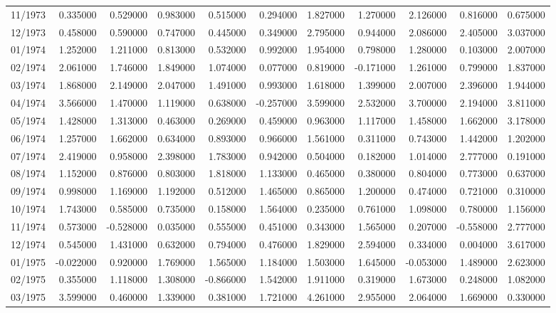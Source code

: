 \begin{tabular}{lrrrrrrrrrr}
11/1973 & 0.335000 & 0.529000 & 0.983000 & 0.515000 & 0.294000 & 1.827000 & 1.270000 & 2.126000 & 0.816000 & 0.675000 \\
12/1973 & 0.458000 & 0.590000 & 0.747000 & 0.445000 & 0.349000 & 2.795000 & 0.944000 & 2.086000 & 2.405000 & 3.037000 \\
01/1974 & 1.252000 & 1.211000 & 0.813000 & 0.532000 & 0.992000 & 1.954000 & 0.798000 & 1.280000 & 0.103000 & 2.007000 \\
02/1974 & 2.061000 & 1.746000 & 1.849000 & 1.074000 & 0.077000 & 0.819000 & -0.171000 & 1.261000 & 0.799000 & 1.837000 \\
03/1974 & 1.868000 & 2.149000 & 2.047000 & 1.491000 & 0.993000 & 1.618000 & 1.399000 & 2.007000 & 2.396000 & 1.944000 \\
04/1974 & 3.566000 & 1.470000 & 1.119000 & 0.638000 & -0.257000 & 3.599000 & 2.532000 & 3.700000 & 2.194000 & 3.811000 \\
05/1974 & 1.428000 & 1.313000 & 0.463000 & 0.269000 & 0.459000 & 0.963000 & 1.117000 & 1.458000 & 1.662000 & 3.178000 \\
06/1974 & 1.257000 & 1.662000 & 0.634000 & 0.893000 & 0.966000 & 1.561000 & 0.311000 & 0.743000 & 1.442000 & 1.202000 \\
07/1974 & 2.419000 & 0.958000 & 2.398000 & 1.783000 & 0.942000 & 0.504000 & 0.182000 & 1.014000 & 2.777000 & 0.191000 \\
08/1974 & 1.152000 & 0.876000 & 0.803000 & 1.818000 & 1.133000 & 0.465000 & 0.380000 & 0.804000 & 0.773000 & 0.637000 \\
09/1974 & 0.998000 & 1.169000 & 1.192000 & 0.512000 & 1.465000 & 0.865000 & 1.200000 & 0.474000 & 0.721000 & 0.310000 \\
10/1974 & 1.743000 & 0.585000 & 0.735000 & 0.158000 & 1.564000 & 0.235000 & 0.761000 & 1.098000 & 0.780000 & 1.156000 \\
11/1974 & 0.573000 & -0.528000 & 0.035000 & 0.555000 & 0.451000 & 0.343000 & 1.565000 & 0.207000 & -0.558000 & 2.777000 \\
12/1974 & 0.545000 & 1.431000 & 0.632000 & 0.794000 & 0.476000 & 1.829000 & 2.594000 & 0.334000 & 0.004000 & 3.617000 \\
01/1975 & -0.022000 & 0.920000 & 1.769000 & 1.565000 & 1.184000 & 1.503000 & 1.645000 & -0.053000 & 1.489000 & 2.623000 \\
02/1975 & 0.355000 & 1.118000 & 1.308000 & -0.866000 & 1.542000 & 1.911000 & 0.319000 & 1.673000 & 0.248000 & 1.082000 \\
03/1975 & 3.599000 & 0.460000 & 1.339000 & 0.381000 & 1.721000 & 4.261000 & 2.955000 & 2.064000 & 1.669000 & 0.330000 \\

\end{tabular}
